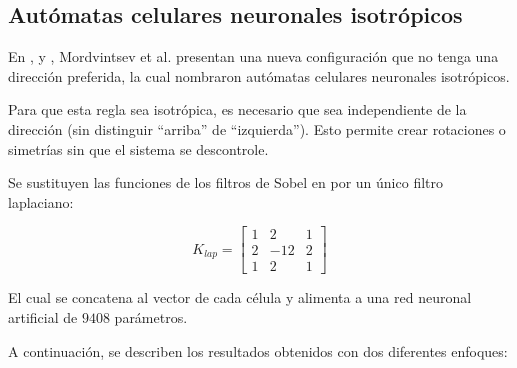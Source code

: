 \subsection{Autómatas celulares neuronales isotrópicos}

En \cite{IsoNCA}, \cite{IsoNCA2} y \cite{SteerableNCA}, Mordvintsev et al. presentan una nueva configuración que no tenga una dirección preferida, la cual nombraron autómatas celulares neuronales isotrópicos.

Para que esta regla sea isotrópica, es necesario que sea independiente de la dirección (sin distinguir ``arriba'' de ``izquierda''). Esto permite crear rotaciones o simetrías sin que el sistema se descontrole.

Se sustituyen las funciones de los filtros de Sobel en \cite{mordvintsevNCA} por un único filtro laplaciano:

\[
K_{lap} = \begin{bmatrix}
	
	1 & 2 & 1 \\
	
	2 & -12 & 2 \\
	
	1 & 2 & 1 
	
\end{bmatrix}
\]

El cual se concatena al vector de cada célula y alimenta a una red neuronal artificial de $9408$ parámetros. 

A continuación, se describen los resultados obtenidos con dos diferentes enfoques:

